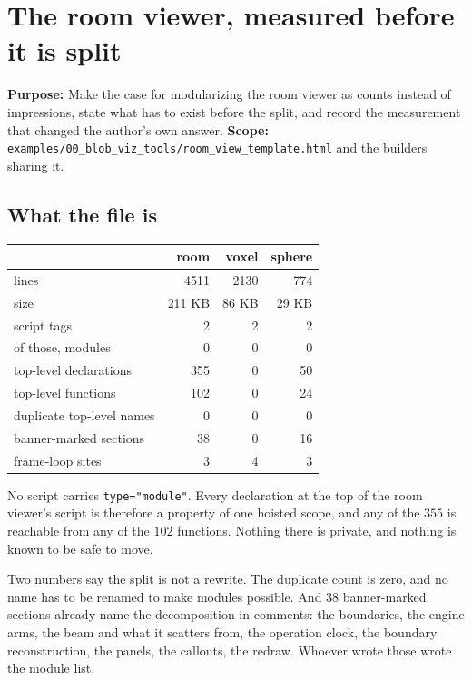 \chapter{The room viewer, measured before it is split}

\textbf{Purpose:} Make the case for modularizing the room viewer as counts instead of impressions, state what has to exist before the split, and record the measurement that changed the author's own answer. \textbf{Scope:} \texttt{examples/\allowbreak{}00\_blob\_viz\_tools/\allowbreak{}room\_view\_template.html} and the builders sharing it.

\section{What the file is}

\begin{center}
\begin{tabular}{@{}lrrr@{}}
\toprule
 & room & voxel & sphere \\
\midrule
lines & 4511 & 2130 & 774 \\
size & 211 KB & 86 KB & 29 KB \\
script tags & 2 & 2 & 2 \\
of those, modules & 0 & 0 & 0 \\
top-level declarations & 355 & 0 & 50 \\
top-level functions & 102 & 0 & 24 \\
duplicate top-level names & 0 & 0 & 0 \\
banner-marked sections & 38 & 0 & 16 \\
frame-loop sites & 3 & 4 & 3 \\
\bottomrule
\end{tabular}
\end{center}

No script carries \texttt{type="module"}. Every declaration at the top of the room viewer's script is therefore a property of one hoisted scope, and any of the \(355\) is reachable from any of the \(102\) functions. Nothing there is private, and nothing is known to be safe to move.

Two numbers say the split is not a rewrite. The duplicate count is zero, and no name has to be renamed to make modules possible. And \(38\) banner-marked sections already name the decomposition in comments: the boundaries, the engine arms, the beam and what it scatters from, the operation clock, the boundary reconstruction, the panels, the callouts, the redraw. Whoever wrote those wrote the module list.

